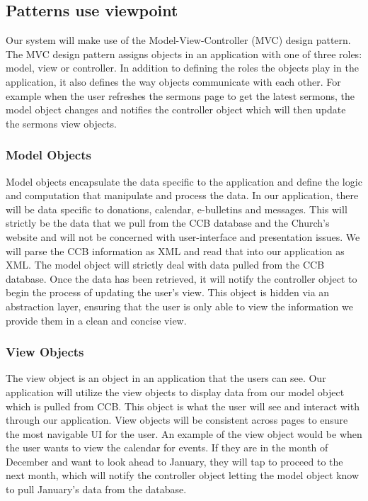 \documentclass[letterpaper,10pt,draftclsnofoot,onecolumn,titlepage]{IEEEtran}
\begin{document}
		\subsection{Patterns use viewpoint}
			Our system will make use of the Model-View-Controller (MVC) design pattern.
			The MVC design pattern assigns objects in an application with one of three roles: model, view or controller.
			In addition to defining the roles the objects play in the application, it also defines the way objects communicate with each other.
			For example when the user refreshes the sermons page to get the latest sermons, the model object changes and notifies the controller object which will then update the sermons view objects.

			\subsubsection{Model Objects}
				Model objects encapsulate the data specific to the application and define the logic and computation that manipulate and process the data.
				In our application, there will be data specific to donations, calendar, e-bulletins and messages.
				This will strictly be the data that we pull from the CCB database and the Church's website and will not be concerned with user-interface and presentation issues.
				We will parse the CCB information as XML and read that into our application as XML.
				The model object will strictly deal with data pulled from the CCB database.
				Once the data has been retrieved, it will notify the controller object to begin the process of updating the user's view.
				This object is hidden via an abstraction layer, ensuring that the user is only able to view the information we provide them in a clean and concise view.

			\subsubsection{View Objects}
				The view object is an object in an application that the users can see.
				Our application will utilize the view objects to display data from our model object which is pulled from CCB.
				This object is what the user will see and interact with through our application.
				View objects will be consistent across pages to ensure the most navigable UI for the user.
				An example of the view object would be when the user wants to view the calendar for events.
				If they are in the month of December and want to look ahead to January, they will tap to proceed to the next month, which will notify the controller object letting the model object know to pull January's data from the database.
\end{document}
